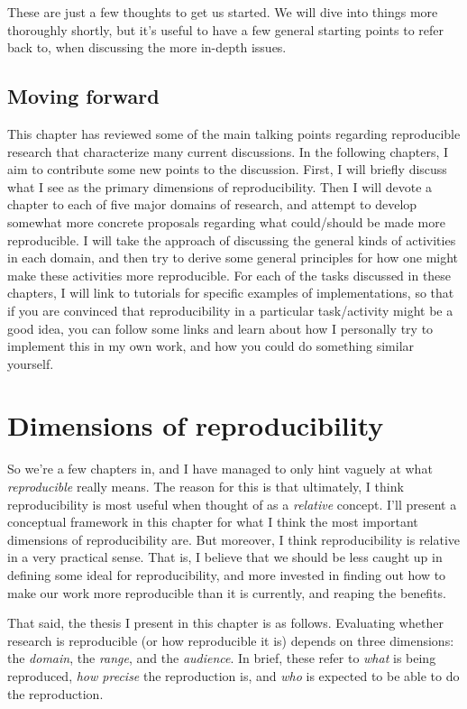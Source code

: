 \documentclass{book}
\begin{document}
\begin{enumerate}
\end{enumerate}

These are just a few thoughts to get us started.  We will dive into things more thoroughly shortly, but it's useful to have a few general starting points to refer back to, when discussing the more in-depth issues.
\section{Moving forward}
\label{sec-2-6}

This chapter has reviewed some of the main talking points regarding reproducible research that characterize many current discussions. In the following chapters, I aim to contribute some new points to the discussion. First, I will briefly discuss what I see as the primary dimensions of reproducibility. Then I will devote a chapter to each of five major domains of research, and attempt to develop somewhat more concrete proposals regarding what could/should be made more reproducible. I will take the approach of discussing the general kinds of activities in each domain, and then try to derive some general principles for how one might make these activities more reproducible.  For each of the tasks discussed in these chapters, I will link to tutorials for specific examples of implementations, so that if you are convinced that reproducibility in a particular task/activity might be a good idea, you can follow some links and learn about how I personally try to implement this in my own work, and how you could do something similar yourself.
\chapter{Dimensions of reproducibility}
\label{sec-3}
\label{dimensions}

So we're a few chapters in, and I have managed to only hint vaguely at what \emph{reproducible} really means.  The reason for this is that ultimately, I think reproducibility is most useful when thought of as a \emph{relative} concept. I'll present a conceptual framework in this chapter for what I think the most important dimensions of reproducibility are. But moreover, I think reproducibility is relative in a very practical sense. That is, I believe that we should be less caught up in defining some ideal for reproducibility, and more invested in finding out how to make our work more reproducible than it is currently, and reaping the benefits.

That said, the thesis I present in this chapter is as follows. Evaluating whether research is reproducible (or how reproducible it is) depends on three dimensions: the \emph{domain}, the \emph{range}, and the \emph{audience}.  In brief, these refer to \emph{what} is being reproduced, \emph{how precise} the reproduction is, and \emph{who} is expected to be able to do the reproduction. 
\end{document}
